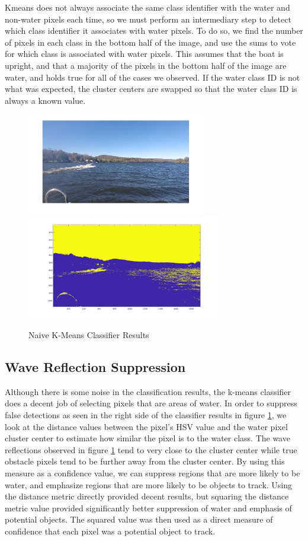 \documentclass{article}
\begin{document}
Kmeans does not always associate the same class identifier with the water and
non-water pixels each time, so we must perform an intermediary step to detect
which class identifier it associates with water pixels.  To do so, we find the
number of pixels in each class in the bottom half of the image, and use the sums
to vote for which class is associated with water pixels. This assumes that the
boat is upright, and that a majority of the pixels in the bottom half of the
image are water, and holds true for all of the cases we observed.  If the water
class ID is not what was expected, the cluster centers are swapped so that the
water class ID is always a known value.

\begin{figure}
\label{fig:kmeans}
\includegraphics[width=7.8cm]{hsv_kmeans2_orig}
\includegraphics[width=8.5cm]{hsv_kmeans2_result}
\centering
\caption{Naive K-Means Classifier Results}
\end{figure}

\subsection{Wave Reflection Suppression}
Although there is some noise in the classification results, the k-means
classifier does a decent job of selecting pixels that are areas of water. In
order to suppress false detections as seen in the right side of the classifier
results in figure \ref{fig:kmeans}, we look at the distance values between the
pixel's HSV value and the water pixel cluster center to estimate how similar the
pixel is to the water class.  The wave reflections observed in figure
\ref{fig:kmeans} tend to very close to the cluster center while true obstacle
pixels tend to be further away from the cluster center.  By using this measure
as a confidence value, we can suppress regions that are more likely to be water,
and emphasize regions that are more likely to be objects to track.  Using the
distance metric directly provided decent results, but squaring the distance
metric value provided significantly better suppression of water and emphasis of
potential objects.  The squared value was then used as a direct measure of
confidence that each pixel was a potential object to track.
\end{document}
